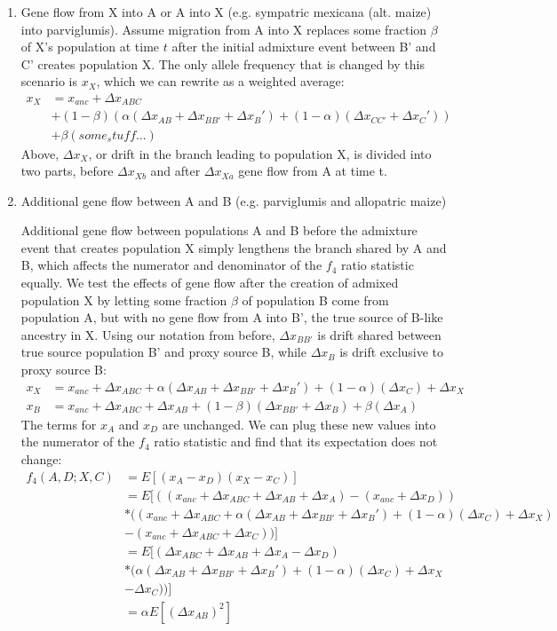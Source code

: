 \documentclass[12pt]{report}
\begin{document}
\begin{enumerate}
	\item Gene flow from X into A or A into X (e.g. sympatric mexicana (alt. maize) into parviglumis).
	Assume migration from A into X replaces some fraction $\beta$ of X's population at time $t$ after the initial admixture event between B' and C' creates population X. The only allele frequency that is changed by this scenario is $x_X$, which we can rewrite as a weighted average:
	\begin{align*}
	x_X &= x_{anc} + \Delta{x_{ABC}} \\
	&+ (1 - \beta)(\alpha(\Delta{x_{AB}} + \Delta{x_{BB'}} + \Delta{x_B'}) + (1 - \alpha)(\Delta{x_{CC'}} + \Delta{x_C'})) \\
	&+ \beta(some_stuff...)
	\end{align*}
	Above, $\Delta{x_X}$, or drift in the branch leading to population X, is divided into two parts, before $\Delta{x_{Xb}}$ and after $\Delta{x_{Xa}}$ gene flow from A at time t.
	\item Additional gene flow between A and B (e.g. parviglumis and allopatric maize) \par
	Additional gene flow between populations A and B before the admixture event that creates population X simply lengthens the branch shared by A and B, which affects the numerator and denominator of the $f_4$ ratio statistic equally. We test the effects of gene flow after the creation of admixed population X by letting some fraction $\beta$ of population B come from population A, but with no gene flow from A into B', the true source of B-like ancestry in X. Using our notation from before, $\Delta{x_{BB'}}$ is drift shared between true source population B' and proxy source B, while $\Delta{x_B}$ is drift exclusive to proxy source B:
	\begin{align*}
	x_X &= x_{anc} + \Delta{x_{ABC}} + \alpha(\Delta{x_{AB}} + \Delta{x_{BB'}} + \Delta{x_B'}) + (1 - \alpha)(\Delta{x_{C}}) + \Delta{x_X} \\
	x_B &= x_{anc} + \Delta{x_{ABC}} + \Delta{x_{AB}} + (1 - \beta)(\Delta{x_{BB'}} + \Delta{x_{B}}) + \beta(\Delta{x_{A}})
	\end{align*}
	The terms for $x_A$ and $x_D$ are unchanged. We can plug these new values into the numerator of the $f_4$ ratio statistic and find that its expectation does not change:
	\begin{align*}
	f_4(A,D;X,C) &= E[(x_A - x_D)(x_X - x_C)] \\
	&= E[((x_{anc} + \Delta{x_{ABC}} + \Delta{x_{AB}} + \Delta{x_{A}}) - (x_{anc} + \Delta{x_{D}}))\\
	&*((x_{anc} + \Delta{x_{ABC}} + \alpha(\Delta{x_{AB}} + \Delta{x_{BB'}} + \Delta{x_B'}) + (1 - \alpha)(\Delta{x_{C}}) + \Delta{x_X}) \\
	&- (x_{anc} + \Delta{x_{ABC}} + \Delta{x_C}))] \\
	&= E[(\Delta{x_{ABC}} + \Delta{x_{AB}} + \Delta{x_{A}} - \Delta{x_{D}})\\
	&*(\alpha(\Delta{x_{AB}} + \Delta{x_{BB'}} + \Delta{x_B'}) + (1 - \alpha)(\Delta{x_{C}}) + \Delta{x_X} \\
	&- \Delta{x_C}))]\\
	&=\alpha E[(\Delta{x_{AB}})^2]
	\end{align*}
	

\end{enumerate}
\end{document}
